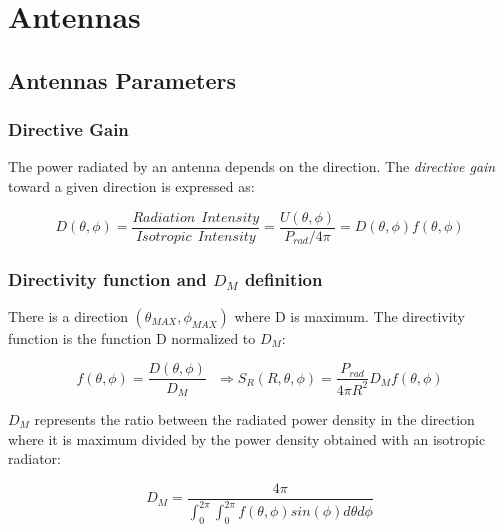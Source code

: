 \chapter{Antennas} %
\label{cha:antennas}

\section{Antennas Parameters} %
\label{sec:antennas_parameters}

\subsection{Directive Gain} %
\label{sub:directive_gain}

The power radiated by an antenna depends on the direction. The \textit{directive gain} toward a given direction is expressed as:

\begin{equation}
	D ( \theta, \phi) = \frac {Radiation \ \ Intensity} {Isotropic \ \ Intensity } = \frac{ U(\theta , \phi)} {P_{rad}/ 4\pi} =  D(\theta , \phi) f(\theta , \phi) 
\end{equation}


\subsection{Directivity function and $D_M$ definition} %
\label{sub:_d_m_}

There is a direction $(\theta_{MAX},\phi_{MAX})$ where D is maximum. The directivity function is the function D normalized to $D_M$:

\begin{equation}
	f(\theta,\phi)=\frac{ \textit{D}(\theta,\phi)}{D_M} \ \ \ \Longrightarrow S_R(R,\theta,\phi)= \frac{P_{rad}}{4\pi R^2} D_M f(\theta,\phi)
\end{equation}

$D_M$ represents the ratio between the radiated power density in the direction where it is maximum divided by the power density obtained with an isotropic radiator:

\begin{equation}
	D_M=\frac{4 \pi }{ \int_0^{2\pi}\int_0^{2\pi} f(\theta,\phi)sin(\phi) d\theta d\phi}
\end{equation}


